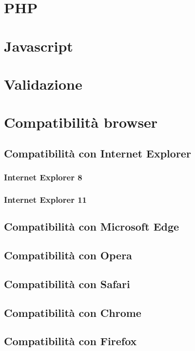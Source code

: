 \documentclass[10pt, a4paper]{article}
\begin{document}
\section{PHP}

\section{Javascript}

\section{Validazione}

\section{Compatibilità browser}

\subsection{Compatibilità con Internet Explorer}

\subsubsection{Internet Explorer 8}

\subsubsection{Internet Explorer 11}

\subsection{Compatibilità con Microsoft Edge}

\subsection{Compatibilità con Opera}

\subsection{Compatibilità con Safari}

\subsection{Compatibilità con Chrome}

\subsection{Compatibilità con Firefox}
\end{document}

